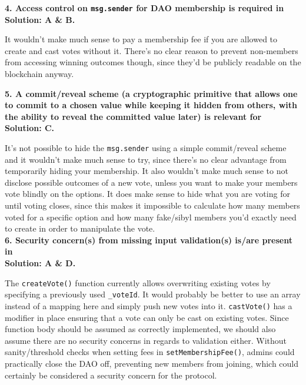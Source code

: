 \textbf{4. Access control on \texttt{msg.sender} for DAO membership is required in}\label{sec:exam7_q4}\\

\textbf{Solution: A \& B.}

 It wouldn't make much sense to pay a membership fee if you are allowed to create and cast votes without it.
 There's no clear reason to prevent non-members from accessing winning outcomes though, since they'd be publicly readable on the blockchain anyway.\\

\pagebreak

\textbf{5. A commit/reveal scheme (a cryptographic primitive that allows one to commit to a chosen value while keeping it hidden from others, with the ability to reveal the committed value later) is relevant for}\label{sec:exam7_q5}\\

\textbf{Solution: C.}

It's not possible to hide the \verb|msg.sender| using a simple commit/reveal scheme and it wouldn't make much sense to try, since there's no clear advantage from temporarily hiding your membership.
It also wouldn't make much sense to not disclose possible outcomes of a new vote, unless you want to make your members vote blindly on the options.
It does make sense to hide what you are voting for until voting closes, since this makes it impossible to calculate how many members voted for a specific option and how many fake/sibyl members you'd exactly need to create in order to manipulate the vote.\\

\textbf{6. Security concern(s) from missing input validation(s) is/are present in}\label{sec:exam7_q6}\\

\textbf{Solution: A \& D.}

The \verb|createVote()| function currently allows overwriting existing votes by specifying a previously used \verb|_voteId|.
It would probably be better to use an array instead of a mapping here and simply push new votes into it.
\verb|castVote()| has a modifier in place ensuring that a vote can only be cast on existing votes.
Since function body should be assumed as correctly implemented, we should also assume there are no security concerns in regards to validation either.
Without sanity/threshold checks when setting fees in \verb|setMembershipFee()|, admins could practically close the DAO off, preventing new members from joining, which could certainly be considered a security concern for the protocol.\\

